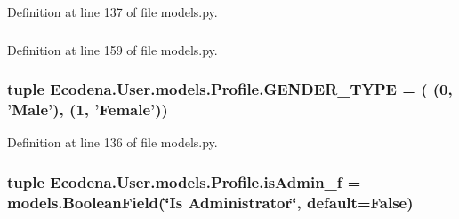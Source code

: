Definition at line 137 of file models.py.

\hypertarget{class_ecodena_1_1_user_1_1models_1_1_profile_ab7dfd7be58c62bacb3fdeef5fcf5477e}{
\subsubsection[{gender\_\-f}]{}}
\label{d2/de8/class_ecodena_1_1_user_1_1models_1_1_profile_ab7dfd7be58c62bacb3fdeef5fcf5477e}


Definition at line 159 of file models.py.

\hypertarget{class_ecodena_1_1_user_1_1models_1_1_profile_ab5f64a30a5708c602dd1eef94ccd811d}{
\subsubsection[{GENDER\_\-TYPE}]{\setlength{\rightskip}{0pt plus 5cm}tuple {\bf Ecodena.User.models.Profile.GENDER\_\-TYPE} = ( (0, 'Male'), (1, 'Female'))}}
\label{d2/de8/class_ecodena_1_1_user_1_1models_1_1_profile_ab5f64a30a5708c602dd1eef94ccd811d}


Definition at line 136 of file models.py.

\hypertarget{class_ecodena_1_1_user_1_1models_1_1_profile_ada687883f8de1aa44a0feee2448b61b8}{
\subsubsection[{isAdmin\_\-f}]{\setlength{\rightskip}{0pt plus 5cm}tuple {\bf Ecodena.User.models.Profile.isAdmin\_\-f} = models.BooleanField(\char`\"{}Is Administrator\char`\"{}, default=False)}}
\label{d2/de8/class_ecodena_1_1_user_1_1models_1_1_profile_ada687883f8de1aa44a0feee2448b61b8}


